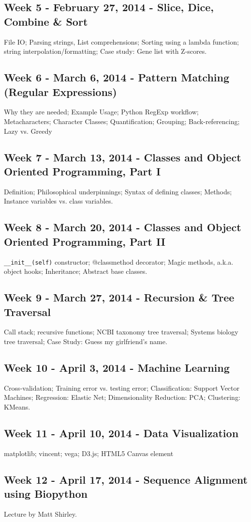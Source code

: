 \documentclass{article}
\begin{document}
\subsection*{Week 5 - February 27, 2014 - Slice, Dice, Combine \& Sort}
File IO; Parsing strings, List comprehensions; Sorting using a lambda function; string interpolation/formatting; Case study: Gene list with Z-scores.
\subsection*{Week 6 - March 6, 2014 - Pattern Matching (Regular Expressions)}
Why they are needed; Example Usage; Python RegExp workflow; Metacharacters; Character Classes; Quantification; Grouping; Back-referencing; Lazy vs. Greedy
\subsection*{Week 7 - March 13, 2014 - Classes and Object Oriented Programming, Part I}
Definition; Philosophical underpinnings;  Syntax of defining classes;  Methods; Instance variables vs. class variables.
\subsection*{Week 8 - March 20, 2014 - Classes and Object Oriented Programming, Part II}
\verb|__init__(self)| constructor; @classmethod decorator; Magic methods, a.k.a. object hooks; Inheritance; Abstract base classes.
\subsection*{Week 9 - March 27, 2014 - Recursion \& Tree Traversal}
Call stack; recursive functions; NCBI taxonomy tree traversal; Systems biology tree traversal; Case Study: Guess my girlfriend's name.
\subsection*{Week 10 - April 3, 2014 - Machine Learning}
Cross-validation; Training error vs. testing error; Classification: Support Vector Machines; Regression: Elastic Net; Dimensionality Reduction: PCA; Clustering: KMeans.
\subsection*{Week 11 - April 10, 2014 - Data Visualization}
matplotlib; vincent; vega; D3.js; HTML5 Canvas element
\subsection*{Week 12 - April 17, 2014 - Sequence Alignment using Biopython}
Lecture by Matt Shirley.
\end{document}
